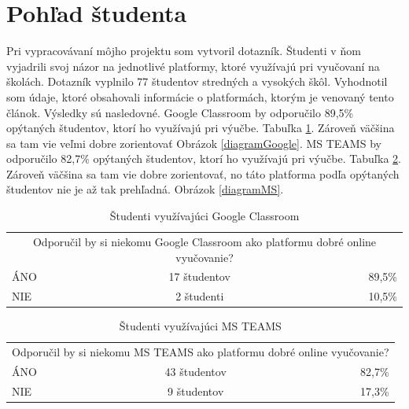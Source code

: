 \documentclass[10pt,slovak,a4paper]{article}
\begin{document}
\section{Pohľad študenta} \label{pohľad studenta}
Pri vypracovávaní môjho projektu som vytvoril dotazník. Študenti v ňom vyjadrili svoj názor na jednotlivé platformy, ktoré využívajú pri vyučovaní na školách. Dotazník vyplnilo 77 študentov stredných a vysokých škôl. Vyhodnotil som údaje, ktoré obsahovali informácie o platformách, ktorým je venovaný tento článok. Výsledky sú nasledovné. Google Classroom by odporučilo 89,5\% opýtaných študentov, ktorí ho využívajú pri výučbe. Tabuľka \ref{tab:tabulkaGoogle}. Zároveň väčšina sa tam vie veľmi dobre zorientovať Obrázok \ref{diagramGoogle}. MS TEAMS by odporučilo 82,7\% opýtaných študentov, ktorí ho využívajú pri výučbe. Tabuľka \ref{tab:tabulkaMS}. Zároveň väčšina sa tam vie dobre zorientovať, no táto platforma podľa opýtaných študentov nie je až tak prehľadná.  Obrázok \ref{diagramMS}.


\begin{table}[htbp]
  \centering
  \caption{Študenti využívajúci Google Classroom}
    \begin{tabular}{|l|cc|r|}
    \toprule
    \multicolumn{4}{|c|}{\multirow{2}[2]{*}{Odporučil by si niekomu Google Classroom ako platformu dobré online vyučovanie?}} \\
    \multicolumn{4}{|c|}{} \\
    \midrule
    ÁNO   & \multicolumn{2}{c|}{17 študentov} & 89,5\% \\
    \midrule
    NIE   & \multicolumn{2}{c|}{2 študenti} & 10,5\% \\
    \bottomrule
    \end{tabular}%
  \label{tab:tabulkaGoogle}%
\end{table}%


\begin{table}[htbp]
  \centering
  \caption{Študenti využívajúci MS TEAMS}
    \begin{tabular}{|l|cc|r|}
    \toprule
    \multicolumn{4}{|c|}{\multirow{2}[2]{*}{Odporučil by si niekomu MS TEAMS ako platformu dobré online vyučovanie?}} \\
    \multicolumn{4}{|c|}{} \\
    \midrule
    ÁNO   & \multicolumn{2}{c|}{43 študentov} & 82,7\% \\
    \midrule
    NIE   & \multicolumn{2}{c|}{9 študentov} & 17,3\% \\
    \bottomrule
    \end{tabular}%
  \label{tab:tabulkaMS}%
\end{table}%
\end{document}
